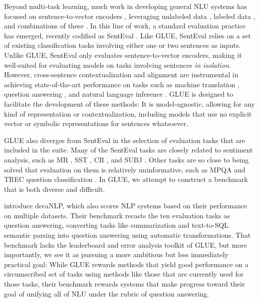 \documentclass{article} \usepackage{iclr2019_conference,times}
\begin{document}
Beyond multi-task learning, much work in developing general NLU systems has focused on sentence-to-vector encoders \citep[][ i.a.]{pmlr-v32-le14,kiros2015skip}, leveraging unlabeled data 
\citep{hill2016learning,peters2018deep}, labeled data \citep{conneau2018senteval,mccann2017learned}, and combinations of these \citep{collobert2011natural,subramanian2018large}.
In this line of work, a standard evaluation practice has emerged, recently codified as SentEval \citep{DBLP:conf/emnlp/ConneauKSBB17,conneau2018senteval}.
Like GLUE, SentEval relies on a set of existing classification tasks involving either one or two sentences as inputs. Unlike GLUE, SentEval only evaluates sentence-to-vector encoders, making it well-suited for evaluating models on tasks involving sentences \emph{in isolation}.
However, cross-sentence contextualization and alignment are instrumental in achieving state-of-the-art performance on tasks such as machine translation \citep{bahdanau2014neural,vaswani2017attention}, question answering \citep{seo2016bidirectional}, and natural language inference \citep{rocktaschel2015reasoning}.
GLUE is designed to facilitate the development of these methods: It is model-agnostic, allowing for any kind of representation or contextualization, including models that use no explicit vector or symbolic representations for sentences whatsoever.


GLUE also diverges from SentEval in the selection of evaluation tasks that are included in the suite. Many of the SentEval tasks are closely related to sentiment analysis, such as MR \citep{pang2005seeing}, SST \citep{socher2013recursive}, CR \citep{hu2004mining}, and SUBJ \citep{pang2004sentimental}. Other tasks are so close to being solved that evaluation on them is relatively  uninformative, such as MPQA \citep{wiebe2005annotating} and TREC question classification \citep{voorhees1999trec}. In GLUE, we attempt to construct a benchmark that is both diverse and difficult.


\citet{McCann2018decaNLP} introduce decaNLP, which also scores NLP systems based on their performance on multiple datasets. Their benchmark recasts the ten evaluation tasks as question answering, converting tasks like summarization and text-to-SQL semantic parsing into question answering using automatic transformations. That benchmark lacks the leaderboard and error analysis toolkit of GLUE, but more importantly, we see it as pursuing a more ambitious but less immediately practical goal: While GLUE rewards methods that yield good performance on a circumscribed set of tasks using methods like those that are currently used for those tasks, their benchmark rewards systems that make progress toward their goal of unifying all of NLU under the rubric of question answering.
\end{document}
